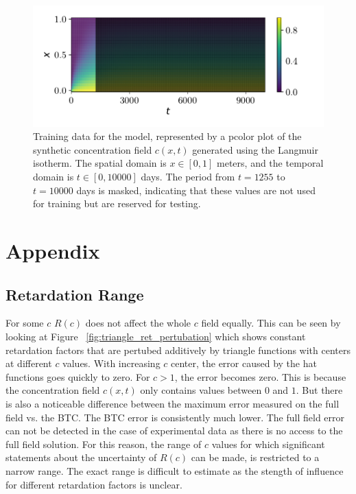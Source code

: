 \begin{figure}[h]
    \centering
    \includegraphics{figs/c_diss_field_full_black_test.pdf}
    \caption{Training data for the model, represented by a pcolor plot of the synthetic concentration field $c(x,t)$ generated using the Langmuir isotherm. The spatial domain is $x \in [0, 1]$ meters, and the temporal domain is $t \in [0, 10000]$ days. The period from $t = 1255$ to $t = 10000$ days is masked, indicating that these values are not used for training but are reserved for testing.}
    \label{fig:c_diss_field_full_black_test}
\end{figure}




\section*{Appendix}


\subsection{Retardation Range} %
For some $c$ $R(c)$ does not affect the whole $c$ field equally. This can be seen by looking at Figure ~\vref{fig:triangle_ret_pertubation} which shows constant retardation factors that are pertubed additively by triangle functions with centers at different $c$ values. With increasing $c$ center, the error caused by the hat functions goes quickly to zero. For $c > 1$, the error becomes zero. This is because the concentration field $c(x,t)$ only contains values between $0$ and $1$. But there is also a noticeable difference between the maximum error measured on the full field vs. the BTC. The BTC error is consistently much lower.
The full field error can not be detected in the case of experimental data as there is no access to the full field solution. For this reason, the range of $c$ values for which significant statements about the uncertainty of $R(c)$ can be made, is restricted to a narrow range. The exact range is difficult to estimate as the stength of influence for different retardation factors is unclear.


